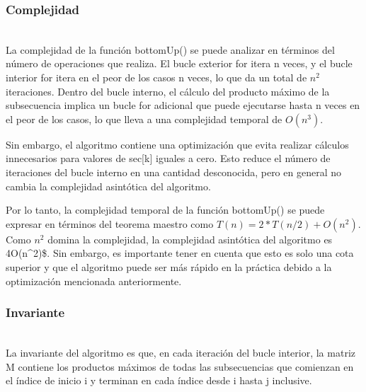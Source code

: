 \documentclass[11pt]{article}
\begin{document}
    \hypertarget{complejidad}{%
\subsubsection{Complejidad}\label{complejidad}}\\

La complejidad de la función bottomUp() se puede analizar en términos
del número de operaciones que realiza. El bucle exterior for itera n
veces, y el bucle interior for itera en el peor de los casos n veces, lo
que da un total de \(n^2\) iteraciones. Dentro del bucle interno, el
cálculo del producto máximo de la subsecuencia implica un bucle for
adicional que puede ejecutarse hasta n veces en el peor de los casos, lo
que lleva a una complejidad temporal de \(O(n^3)\).

Sin embargo, el algoritmo contiene una optimización que evita realizar
cálculos innecesarios para valores de sec{[}k{]} iguales a cero. Esto
reduce el número de iteraciones del bucle interno en una cantidad
desconocida, pero en general no cambia la complejidad asintótica del
algoritmo.

Por lo tanto, la complejidad temporal de la función bottomUp() se puede
expresar en términos del teorema maestro como
\(T(n) = 2*T(n/2) + O(n^2)\). Como \(n^2\) domina la complejidad, la
complejidad asintótica del algoritmo es 4O(n\^{}2)\$. Sin embargo, es
importante tener en cuenta que esto es solo una cota superior y que el
algoritmo puede ser más rápido en la práctica debido a la optimización
mencionada anteriormente.

\hypertarget{Invariante}{%
\subsubsection{Invariante}\label{complejidad}}\\
La invariante del algoritmo es que, en cada iteración del bucle interior, la matriz M
contiene los productos máximos de todas las subsecuencias que comienzan
en el índice de inicio i y terminan en cada índice desde i hasta j
inclusive.
\end{document}
